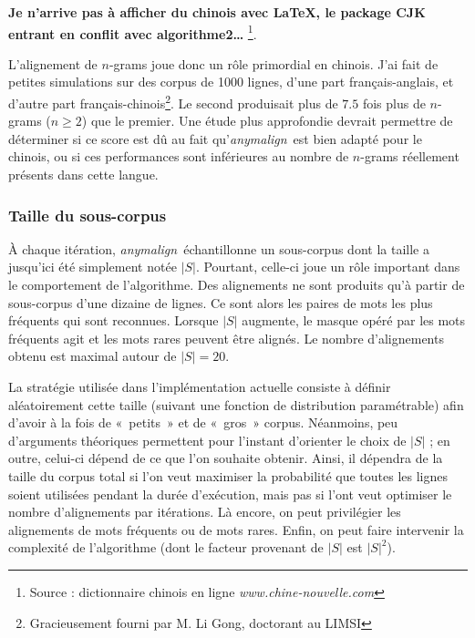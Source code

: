 \documentclass[a4paper,10pt]{article}
\newcommand{\anym}{\emph{anymalign}}
\newcommand{\guill}[1]{«~#1~»}
\begin{document}
\textbf{Je n'arrive pas à afficher du chinois avec \LaTeX, le package CJK entrant en conflit avec algorithme2\dots}
\footnote{Source : dictionnaire chinois en ligne \emph{www.chine-nouvelle.com}}.

L'alignement de $n$-grams joue donc un rôle primordial en chinois. J'ai fait de petites simulations sur des corpus de 1000 lignes, d'une part français-anglais, et d'autre part français-chinois\footnote{Gracieusement fourni par M. Li Gong, doctorant au LIMSI}. Le second produisait plus de $7.5$ fois plus de $n$-grams ($n\geq2$) que le premier. Une étude plus approfondie devrait permettre de déterminer si ce score est dû au fait qu'\anym~est bien adapté pour le chinois, ou si ces performances sont inférieures au nombre de $n$-grams réellement présents dans cette langue.



\subsubsection{Taille du sous-corpus}

\`A chaque itération, \anym~échantillonne un sous-corpus dont la taille a jusqu'ici été simplement notée $|S|$. Pourtant, celle-ci joue un rôle important dans le comportement de l'algorithme. Des alignements ne sont produits qu'à partir de sous-corpus d'une dizaine de lignes. Ce sont alors les paires de mots les plus fréquents qui sont reconnues. Lorsque $|S|$ augmente, le masque opéré par les mots fréquents agit et les mots rares peuvent être alignés. Le nombre d'alignements obtenu est maximal autour de $|S|=20$.

La stratégie utilisée dans l'implémentation actuelle consiste à définir aléatoirement cette taille (suivant une fonction de distribution paramétrable) afin d'avoir à la fois de \guill{petits} et de \guill{gros} corpus. Néanmoins, peu d'arguments théoriques permettent pour l'instant d'orienter le choix de $|S|$ ; en outre, celui-ci dépend de ce que l'on souhaite obtenir. Ainsi, il dépendra de la taille du corpus total si l'on veut maximiser la probabilité que toutes les lignes soient utilisées pendant la durée d'exécution, mais pas si l'ont veut optimiser le nombre d'alignements par itérations. Là encore, on peut privilégier les alignements de mots fréquents ou de mots rares. Enfin, on peut faire intervenir la complexité de l'algorithme (dont le facteur provenant de $|S|$ est $|S|^2$).
\end{document}
